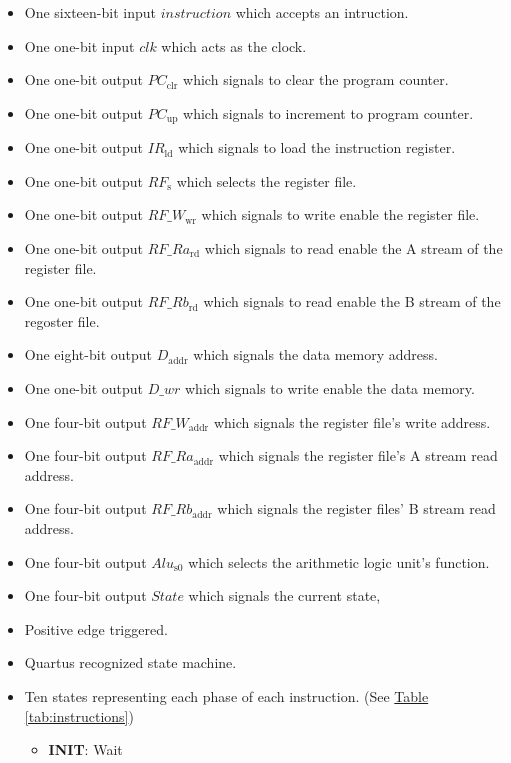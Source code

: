 \begin{itemize}
    \item One sixteen-bit input $instruction$ which accepts an intruction.
    \item One one-bit input $clk$ which acts as the clock.
    \item One one-bit output $PC_\text{clr}$ which signals to clear the program counter.
    \item One one-bit output $PC_\text{up}$ which signals to increment to program counter.
    \item One one-bit output $IR_\text{ld}$ which signals to load the instruction register.
    \item One one-bit output $RF_\text{s}$ which selects the register file.
    \item One one-bit output $RF\_W_\text{wr}$ which signals to write enable the register file.
    \item One one-bit output $RF\_Ra_\text{rd}$ which signals to read enable the A stream of the register file.
    \item One one-bit output $RF\_Rb_\text{rd}$ which signals to read enable the B stream of the regoster file.
    \item One eight-bit output $D_\text{addr}$ which signals the data memory address.
    \item One one-bit output $D\_wr$ which signals to write enable the data memory.
    \item One four-bit output $RF\_W_\text{addr}$ which signals the register file's write address.
    \item One four-bit output $RF\_Ra_\text{addr}$ which signals the register file's A stream read address.
    \item One four-bit output $RF\_Rb_\text{addr}$ which signals the register files' B stream read address.
    \item One four-bit output $Alu_\text{s0}$ which selects the arithmetic logic unit's function.
    \item One four-bit output $State$ which signals the current state,
    \item Positive edge triggered.
    \item Quartus recognized state machine.
    \item Ten states representing each phase of each instruction.
    (See \hyperref[tab:instructions]{Table \ref*{tab:instructions}})
    \begin{itemize}
        \item \textbf{INIT}: Wait

\end{itemize}
\end{itemize}
